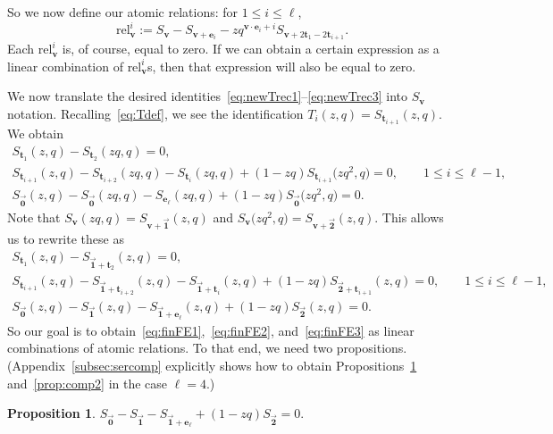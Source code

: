 \documentclass[pdftex]{sigma}
\numberwithin{equation}{section}
\newtheorem{Proposition}[Theorem]{Proposition}
\theoremstyle{definition}
\newcommand{\rel}{\text{rel}}
\newcommand{\tr}{\mathbf{t}}
\newcommand{\vv}{\mathbf{v}}
\newcommand{\ee}{\mathbf{e}}
\newcommand{\two}{\vec{\mathbf{2}}}
\newcommand{\one}{\vec{\mathbf{1}}}
\newcommand{\zero}{\vec{\mathbf{0}}}
\begin{document}
So we now define our atomic relations: for $1\le i \le \ell$,
\begin{equation*}
\rel^i_\vv:=S_\vv - S_{\vv+\ee_i} - zq^{\vv\cdot\ee_i+i} S_{\vv+2\tr_1-2\tr_{i+1}}.
\end{equation*}
Each $\rel^i_\vv$ is, of course, equal to zero. If we can obtain a certain expression as a linear combination of $\rel^i_\vv$s, then that expression will also be equal to zero.

We now translate the desired identities~\eqref{eq:newTrec1}--\eqref{eq:newTrec3} into $S_\vv$ notation. Recalling~\eqref{eq:Tdef}, we see the identification $T_i(z,q) = S_{\tr_{i+1}}(z,q).$ We obtain
\begin{gather*}
S_{\tr_1}(z,q)-S_{\tr_2}(zq,q) =0, \\
S_{\tr_{i+1}}(z,q) - S_{\tr_{i+2}}(zq,q) - S_{\tr_{i}}(zq,q) + (1-zq)S_{\tr_{i+1}}\bigl(zq^2,q\bigr) =0, \qquad 1 \le i \le \ell-1, \\
S_{\zero}(z,q) - S_{\zero}(zq,q) -S_{\ee_\ell}(zq,q) + (1-zq) S_{\zero}\bigl(zq^2,q\bigr) = 0.
\end{gather*}
Note that $S_\vv(zq,q) = S_{\vv+\one} (z,q)$ and $S_\vv\bigl(zq^2,q\bigr) = S_{\vv+\two} (z,q)$. This allows us to rewrite these as
\begin{gather}
S_{\tr_1}(z,q)-S_{\one+\tr_2}(z,q) =0, \label{eq:finFE1} \\
S_{\tr_{i+1}}(z,q) - S_{\one+\tr_{i+2}}(z,q) - S_{\one+\tr_{i}}(z,q) + (1-zq)S_{\two+\tr_{i+1}}(z,q) =0, \qquad\! 1 \le i \le \ell-1,\!\!\! \label{eq:finFE2} \\
S_{\zero}(z,q) - S_{\one}(z,q) -S_{\one+\ee_\ell}(z,q) + (1-zq) S_{\two}(z,q) = 0. \label{eq:finFE3}
\end{gather}
So our goal is to obtain~\eqref{eq:finFE1},~\eqref{eq:finFE2}, and~\eqref{eq:finFE3} as linear combinations of atomic relations. To that end, we need two propositions. (Appendix~\ref{subsec:sercomp} explicitly shows how to obtain Propositions~\ref{prop:comp1} and~\ref{prop:comp2} in the case $\ell=4$.)
\begin{Proposition} \label{prop:comp1}
$S_{\zero} - S_{\one} -
S_{\one+\ee_\ell} + (1-zq) S_{\two}=0.$
\end{Proposition}
\end{document}
